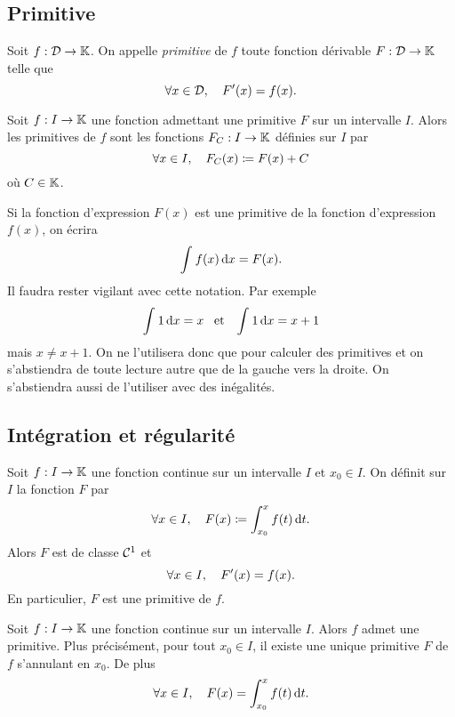 \documentclass{magnoliaold}
\begin{document}
\subsection{Primitive}
\begin{definition}[utile=-3]
Soit $f:\mathcal{D}\to\mathbb{K}$. On appelle
\emph{primitive} de $f$ toute fonction dérivable $F:\mathcal{D}\to\mathbb{K}$ telle que
\[\forall x\in\mathcal{D} ,\quad F'(x)=f(x).\]
\end{definition}

\begin{proposition}[utile=-3]
Soit $f:I\to\mathbb{K}$ une fonction  admettant une primitive $F$ sur un
intervalle $I$. Alors les primitives de $f$ sont les fonctions $F_C:I\to\mathbb{K}$ définies
sur $I$ par
\[\forall x\in I ,\quad F_C(x)\coloneqq F(x)+C\]
où $C\in\mathbb{K}$.
\end{proposition}

\begin{remarqueUnique}
\remarque Si la fonction d'expression $F(x)$ est une primitive de la fonction d'expression $f(x)$, on écrira
  \[\int_{}^{} f(x)\,\text{d}x=F(x).\]
  Il faudra rester vigilant avec cette notation. Par exemple
  \[\int_{}^{} 1\,\text{d}x=x \quad\!\text{et}\quad\! \int_{}^{} 1\,\text{d}x=x+1\]
  mais $x\neq x+1$. On ne l'utilisera donc que pour calculer des primitives et on s'abstiendra de toute lecture autre que de la gauche vers la droite. On s'abstiendra aussi de l'utiliser avec des inégalités. 
\end{remarqueUnique}

\subsection{Intégration et régularité}

\begin{proposition}[utile=-3]
Soit $f:I\to\mathbb{K}$ une fonction continue sur un intervalle $I$ et $x_0\in I$. On
définit sur $I$ la fonction $F$ par
\[\forall x\in I ,\quad F(x)\coloneqq\int_{x_0}^{x} f(t)\,\text{d}t.\]
Alors $F$ est de classe $\mathcal{C}^{1}$ et
  \[\forall x\in I ,\quad F'(x)=f(x).\]
En particulier, $F$ est une primitive de $f$.
\end{proposition}


\begin{proposition}[utile=-3]
  Soit $f:I\to\mathbb{K}$ une fonction continue sur un intervalle $I$. Alors $f$ admet une
  primitive. Plus précisément, pour tout $x_0\in I$, il existe une unique
  primitive $F$ de $f$ s'annulant en $x_0$. De plus
  $$\forall x\in I ,\quad F(x)=\int_{x_0}^{x} f(t)\,\text{d}t.$$
\end{proposition}
\end{document}
